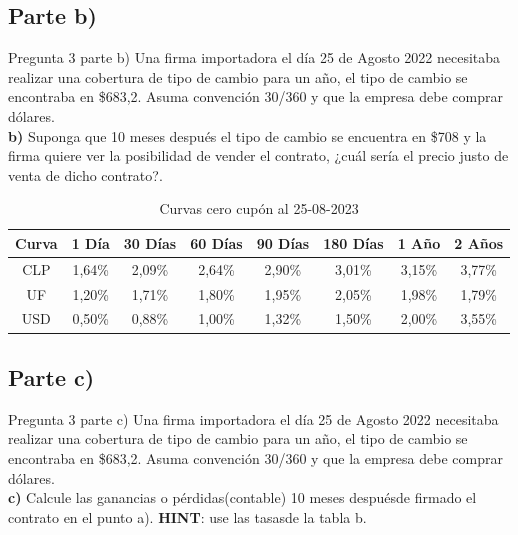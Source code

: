 \documentclass{beamer}
\begin{document}
\subsection{Parte b)}
\begin{frame}{Pregunta 3 parte b)}
  Una firma importadora el día 25 de Agosto 2022 necesitaba realizar una cobertura de tipo de cambio 
para un año, el tipo de cambio se encontraba en \$683,2. Asuma convención 30/360 y que la empresa debe comprar dólares.\\

\textbf{b)} Suponga que 10 meses después el tipo de cambio se encuentra en \$708 y la firma quiere ver
  la posibilidad de vender el contrato, ¿cuál sería el precio justo de venta de dicho contrato?.
  \begin{table}[h!]
      \centering
      \caption{Curvas cero cupón al 25-08-2023}
      \begin{tabular}{|c|c|c|c|c|c|c|c|}
      \hline
      \textbf{Curva} & \textbf{1 Día} & \textbf{30 Días} & \textbf{60 Días} & \textbf{90 Días} & \textbf{180 Días} & \textbf{1 Año} & \textbf{2 Años} \\
      \hline
      CLP & 1{,}64\% & 2{,}09\% & 2{,}64\% & 2{,}90\% & 3{,}01\% & 3{,}15\% & 3{,}77\% \\
      UF  & 1{,}20\% & 1{,}71\% & 1{,}80\% & 1{,}95\% & 2{,}05\% & 1{,}98\% & 1{,}79\% \\
      USD & 0{,}50\% & 0{,}88\% & 1{,}00\% & 1{,}32\% & 1{,}50\% & 2{,}00\% & 3{,}55\% \\
      \hline
      \end{tabular}
  \end{table}  
\end{frame}

\subsection{Parte c)}
\begin{frame}{Pregunta 3 parte c)}
  Una firma importadora el día 25 de Agosto 2022 necesitaba realizar una cobertura de tipo de cambio 
  para un año, el tipo de cambio se encontraba en \$683,2. Asuma convención 30/360 y que la empresa debe comprar dólares.\\
  \textbf{c)} Calcule las ganancias o pérdidas(contable) 10 meses despuésde firmado el contrato en el 
  punto a). \textbf{HINT}: use las tasasde la tabla b.  
  
\end{frame}
\end{document}

